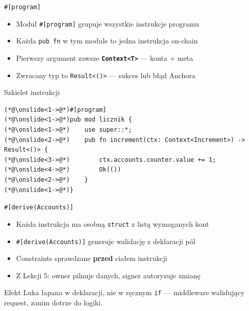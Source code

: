 \begin{frame}[fragile]{\texttt{\#[program]}}
  \begin{itemize}
    \item Moduł \texttt{\#[program]} grupuje wszystkie instrukcje programu
    \item Każda \texttt{pub fn} w tym module to jedna instrukcja on-chain
    \item Pierwszy argument zawsze \texttt{\textbf{Context<T>}} --- konta + meta
    \item Zwracany typ to \texttt{Result<()>} --- sukces lub błąd Anchora
  \end{itemize}
  \begin{codeblock}{Szkielet instrukcji}
\begin{lstlisting}[style=reveal]
(*@\onslide<1->@*)#[program]
(*@\onslide<1->@*)pub mod licznik {
(*@\onslide<1->@*)    use super::*;
(*@\onslide<2->@*)    pub fn increment(ctx: Context<Increment>) -> Result<()> {
(*@\onslide<3->@*)        ctx.accounts.counter.value += 1;
(*@\onslide<4->@*)        Ok(())
(*@\onslide<2->@*)    }
(*@\onslide<1->@*)}
\end{lstlisting}
  \end{codeblock}
\end{frame}

\begin{frame}[fragile]{\texttt{\#[derive(Accounts)]}}
  \begin{itemize}
    \item Każda instrukcja ma osobną \texttt{struct} z listą wymaganych kont
    \item \texttt{\#[derive(Accounts)]} generuje walidację z deklaracji pól
    \item Constraints sprawdzane \textbf{przed} ciałem instrukcji
    \item Z Lekcji 5: owner pilnuje danych, signer autoryzuje zmianę
  \end{itemize}
  \begin{exampleblock}{Efekt}
    Luka łapana w deklaracji, nie w ręcznym \texttt{if} --- middleware walidujący
    request, zanim dotrze do logiki.
  \end{exampleblock}
\end{frame}

